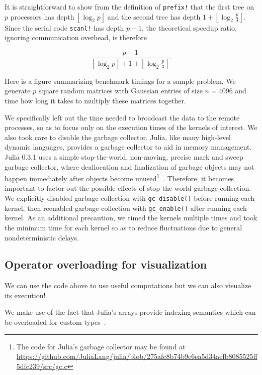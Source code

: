 \documentclass{sig-alternate}
\newcommand{\code}[1]{\texttt{#1}}
\newcommand{\floor}[1]{\left\lfloor #1 \right\rfloor}
\begin{document}
It is straightforward to show from the definition of \code{prefix!} that the first tree on $p$ processors has depth $\floor{\log_2 p}$ and the second tree has depth $1 + \floor{\log_2 \frac p 3}$. Since the serial code \code{scanl!} has depth $p-1$, the theoretical speedup ratio, ignoring communication overhead, is therefore

\begin{equation}
    \frac {p-1} {\floor{\log_2 p} + 1 + \floor{\log_2 \frac p 3}}.
\end{equation}

Here is a figure summarizing benchmark timings for a sample problem. We generate $p$ square random matrices with Gaussian entries of size $n = 4096$ and time how long it takes to multiply these matrices together.

\begin{figure}
\end{figure}

We specifically left out the time needed to broadcast the data to the remote processes, so as to focus only on the execution times of the kernels of interest. We also took care to disable the garbage collector. Julia, like many high-level dynamic languages, provides a garbage collector to aid in memory management. Julia 0.3.1 uses a simple stop-the-world, non-moving, precise mark and sweep garbage collector, where deallocation and finalization of garbage objects may not happen immediately after objects become unused\footnote{The code for Julia's garbage collector may be found at \url{https://github.com/JuliaLang/julia/blob/275afc8b74b9c6ea5d34aefb8085525ff5dfc239/src/gc.c}}~\cite{McCarthy1960}. Therefore, it becomes important to factor out the possible effects of stop-the-world garbage collection. We explicitly disabled garbage collection with \code{gc\_disable()} before running each kernel, then reenabled garbage collection with \code{gc\_enable()} after running each kernel. As an additional precaution, we timed the kernels multiple times and took the minimum time for each kernel so as to reduce fluctuations due to general nondeterministic delays.

\subsection{Operator overloading for visualization}

We can use the code above to use useful computations but we can also visualize its execution!

We make use of the fact that Julia's arrays provide indexing semantics which can be overloaded for custom types~\cite{Bezanson2014}.
\end{document}
